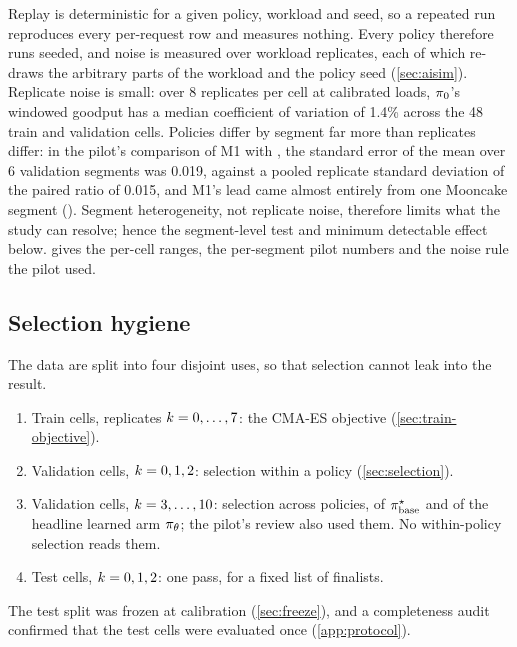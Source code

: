 Replay is deterministic for a given policy, workload and seed, so a repeated run reproduces every
per-request row and measures nothing. Every policy therefore runs seeded, and noise is measured over
workload replicates, each of which re-draws the arbitrary parts of the workload and the policy seed
(\cref{sec:aisim}).
Replicate noise is small: over 8 replicates per cell at calibrated loads, $\pi_{0}$'s windowed
goodput has a median coefficient of variation of 1.4\% across the 48 train and validation cells.
Policies differ by segment far more than replicates differ: in the pilot's comparison of M1 with
, the standard error of the mean over 6 validation segments was 0.019,
against a pooled replicate standard deviation of the paired ratio of 0.015, and M1's lead came almost entirely from one
Mooncake segment (\prelim). Segment heterogeneity, not replicate noise, therefore limits what the
study can resolve; hence the segment-level test and minimum detectable effect below.
 gives the per-cell ranges, the per-segment pilot numbers and the noise rule the
pilot used.

\subsection{Selection hygiene}
\label{sec:hygiene}

The data are split into four disjoint uses, so that selection cannot leak into the result.
\begin{enumerate}
  \item Train cells, replicates $k = 0,\dots,7$: the CMA-ES objective (\cref{sec:train-objective}).
  \item Validation cells, $k = 0,1,2$: selection within a policy (\cref{sec:selection}).
  \item Validation cells, $k = 3,\dots,10$: selection across policies, of $\pi^{\star}_{\mathrm{base}}$ and of the
    headline learned arm $\pi_{\theta}$; the pilot's review also used them. No within-policy selection
    reads them.
  \item Test cells, $k = 0,1,2$: one pass, for a fixed list of finalists.
\end{enumerate}
The test split was frozen at calibration (\cref{sec:freeze}), and a completeness audit confirmed
that the test cells were evaluated once (\cref{app:protocol}).

